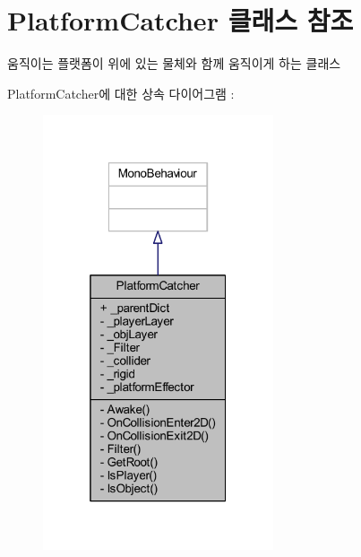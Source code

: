 \hypertarget{class_platform_catcher}{}\section{Platform\+Catcher 클래스 참조}
\label{class_platform_catcher}


움직이는 플랫폼이 위에 있는 물체와 함께 움직이게 하는 클래스  




Platform\+Catcher에 대한 상속 다이어그램 \+: \nopagebreak
\begin{figure}[H]
\begin{center}
\leavevmode
\includegraphics[width=193pt]{df/d0a/class_platform_catcher__inherit__graph}
\end{center}
\end{figure}



